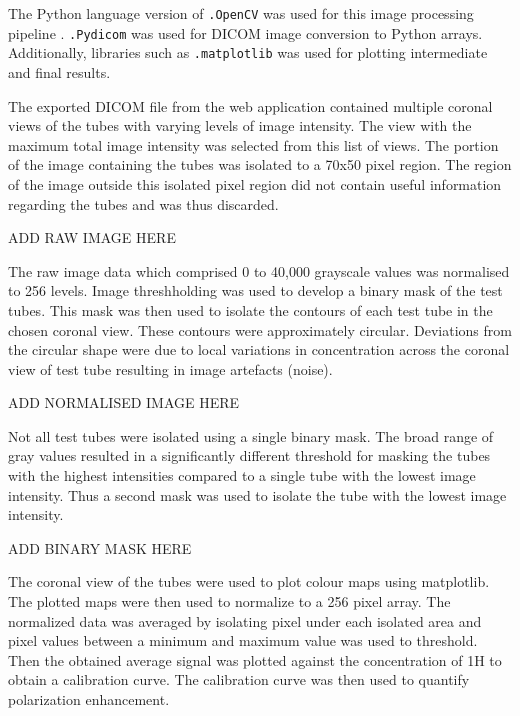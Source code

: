 \documentclass[final,3p,times,twocolumn]{elsarticle}
\begin{document}
The Python language version of \texttt{.OpenCV} was used for this image processing pipeline \cite{opencv_library}. \texttt{.Pydicom} \cite{mason2011t} was used for DICOM image conversion to Python arrays. Additionally, libraries such as \texttt{.matplotlib} was used for plotting intermediate and final results. 

The exported DICOM file from the web application contained multiple coronal views of the tubes with varying levels of image intensity. The view with the maximum total image intensity was selected from this list of views. The portion of the image containing the tubes was isolated to a 70x50 pixel region. The region of the image outside this isolated pixel region did not contain useful information regarding the tubes and was thus discarded.

ADD RAW IMAGE HERE

The raw image data which comprised 0 to 40,000 grayscale values was normalised to 256 levels. Image threshholding was used to develop a binary mask of the test tubes. This mask was then used to isolate the contours of each test tube in the chosen coronal view. These contours were approximately circular. Deviations from the circular shape were due to local variations in concentration across the coronal view of test tube resulting in image artefacts (noise). 

ADD NORMALISED IMAGE HERE

Not all test tubes were isolated using a single binary mask. The broad range of gray values resulted in a significantly different threshold for masking the tubes with the highest intensities compared to a single tube with the lowest image intensity. Thus a second mask was used to isolate the tube with the lowest image intensity.

ADD BINARY MASK HERE 

The coronal view of the tubes were used to plot colour maps using matplotlib. The plotted maps were then used to normalize to a 256 pixel array. The normalized data was averaged by isolating pixel under each isolated area and pixel values between a minimum and maximum value was used to threshold. Then the obtained average signal was plotted against the concentration of 1H to obtain a calibration curve. 
The calibration curve was then used to quantify polarization enhancement. 
\end{document}
